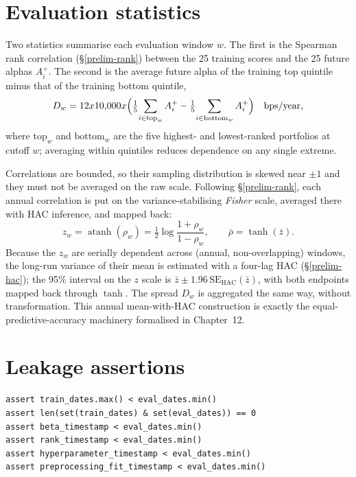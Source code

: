 \hypertarget{evaluation-statistics}{%
\section{Evaluation statistics}\label{evaluation-statistics}}

Two statistics summarise each evaluation window $w$. The first is the
Spearman rank correlation (\S\ref{prelim-rank}) between the 25 training
scores and the 25 future alphas $A_i^{+}$. The second is the average future
alpha of the training top quintile minus that of the training bottom
quintile,
\begin{equation}\label{eq:ch11-spread}
D_w = 12\times10{,}000\times\Bigl(\tfrac15\!\sum_{i\in\text{top}_w} A_i^{+}
 - \tfrac15\!\sum_{i\in\text{bottom}_w} A_i^{+}\Bigr)\quad\text{bps/year},
\end{equation}
where $\text{top}_w$ and $\text{bottom}_w$ are the five highest- and
lowest-ranked portfolios at cutoff $w$; averaging within quintiles reduces
dependence on any single extreme.

Correlations are bounded, so their sampling distribution is skewed near
$\pm1$ and they must not be averaged on the raw scale. Following
\S\ref{prelim-rank}, each annual correlation is put on the
variance-stabilising \emph{Fisher} scale, averaged there with HAC
inference, and mapped back:
\begin{equation}\label{eq:ch11-fisher}
z_w = \operatorname{atanh}(\rho_w) = \tfrac12\log\frac{1+\rho_w}{1-\rho_w},
\qquad \bar\rho = \tanh(\bar z).
\end{equation}
Because the $z_w$ are serially dependent across (annual, non-overlapping)
windows, the long-run variance of their mean is estimated with a four-lag
HAC (\S\ref{prelim-hac}); the 95\% interval on the $z$ scale is
$\bar z \pm 1.96\,\mathrm{SE}_{\mathrm{HAC}}(\bar z)$, with both endpoints
mapped back through $\tanh$. The spread $D_w$ is aggregated the same way,
without transformation. This annual mean-with-HAC construction is exactly
the equal-predictive-accuracy machinery formalised in Chapter~12.

\hypertarget{leakage-assertions}{%
\section{Leakage assertions}\label{leakage-assertions}}

\begin{verbatim}
assert train_dates.max() < eval_dates.min()
assert len(set(train_dates) & set(eval_dates)) == 0
assert beta_timestamp < eval_dates.min()
assert rank_timestamp < eval_dates.min()
assert hyperparameter_timestamp < eval_dates.min()
assert preprocessing_fit_timestamp < eval_dates.min()
\end{verbatim}

